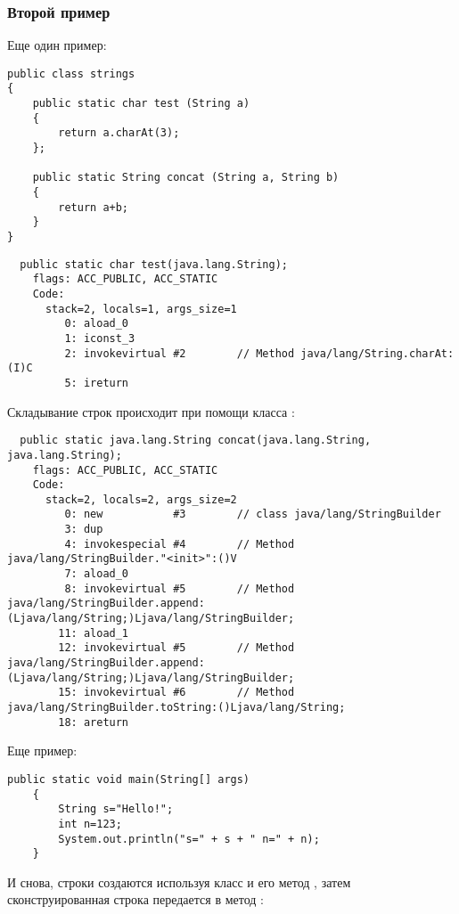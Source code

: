 \subsubsection{Второй пример}

Еще один пример:

\begin{lstlisting}[style=customjava]
public class strings
{
	public static char test (String a)
	{
		return a.charAt(3);
	};

	public static String concat (String a, String b)
	{
		return a+b;
	}
}
\end{lstlisting}

\begin{lstlisting}
  public static char test(java.lang.String);
    flags: ACC_PUBLIC, ACC_STATIC
    Code:
      stack=2, locals=1, args_size=1
         0: aload_0       
         1: iconst_3      
         2: invokevirtual #2        // Method java/lang/String.charAt:(I)C
         5: ireturn       
\end{lstlisting}
         

Складывание строк происходит при помощи класса :

\begin{lstlisting}
  public static java.lang.String concat(java.lang.String, java.lang.String);
    flags: ACC_PUBLIC, ACC_STATIC
    Code:
      stack=2, locals=2, args_size=2
         0: new           #3        // class java/lang/StringBuilder
         3: dup           
         4: invokespecial #4        // Method java/lang/StringBuilder."<init>":()V
         7: aload_0       
         8: invokevirtual #5        // Method java/lang/StringBuilder.append:(Ljava/lang/String;)Ljava/lang/StringBuilder;
        11: aload_1       
        12: invokevirtual #5        // Method java/lang/StringBuilder.append:(Ljava/lang/String;)Ljava/lang/StringBuilder;
        15: invokevirtual #6        // Method java/lang/StringBuilder.toString:()Ljava/lang/String;
        18: areturn       
\end{lstlisting}

Еще пример:

\begin{lstlisting}[style=customjava]
	public static void main(String[] args)
	{
		String s="Hello!";
		int n=123;
		System.out.println("s=" + s + " n=" + n);
	}
\end{lstlisting}


И снова, строки создаются используя класс  и его метод ,
затем сконструированная строка передается в метод :

